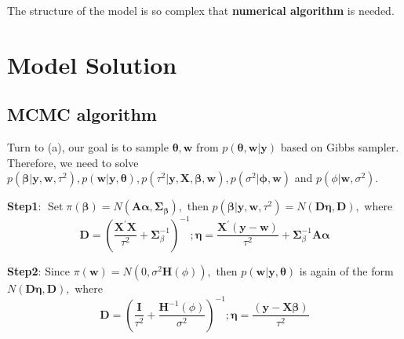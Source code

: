 \documentclass[
]{article}
\begin{document}
The structure of the model is so complex that
\textbf{numerical algorithm} is needed.

\hypertarget{model-solution}{%
\section{Model Solution}\label{model-solution}}

\hypertarget{mcmc-algorithm}{%
\subsection{MCMC algorithm}\label{mcmc-algorithm}}

Turn to (a), our goal is to sample
\(\boldsymbol{\theta}, \boldsymbol{w}\) from
\(p(\boldsymbol{\theta}, \boldsymbol{w} | \boldsymbol{y})\) based on
Gibbs sampler. Therefore, we need to solve
\(p\left(\boldsymbol{\beta} | \boldsymbol{y}, \boldsymbol{w}, \tau^{2}\right), p(\boldsymbol{w} | \boldsymbol{y}, \boldsymbol{\theta}), p\left(\tau^{2} | \boldsymbol{y}, \boldsymbol{X}, \boldsymbol{\beta}, \boldsymbol{w}\right), p\left(\sigma^{2} | \boldsymbol{\phi}, \boldsymbol{w}\right)\)
and \(p\left(\phi | \boldsymbol{w}, \sigma^{2}\right).\)

\textbf{Step1}:
\(\operatorname{Set} \pi(\boldsymbol{\beta})=N\left(\boldsymbol{A} \boldsymbol{\alpha}, \boldsymbol{\Sigma}_{\boldsymbol{\beta}}\right),\)
then
\(p\left(\boldsymbol{\beta} | \boldsymbol{y}, \boldsymbol{w}, \tau^{2}\right)=N(\boldsymbol{D} \boldsymbol{\eta}, \boldsymbol{D}),\)
where \begin{equation}
\boldsymbol{D}=\left(\frac{\bm{X}^{\prime} \bm{X}}{\tau^{2}}+\boldsymbol{\Sigma}_{\beta}^{-1}\right)^{-1} ; \boldsymbol{\eta}=\frac{\boldsymbol{X}^{\prime}(\boldsymbol{y}-\boldsymbol{w})}{\tau^{2}}+\boldsymbol{\Sigma}_{\beta}^{-1} \boldsymbol{A} \boldsymbol{\alpha} \label{Eq:Post_Beta_Dis}
\end{equation}

\textbf{Step2}: Since
\(\pi(\boldsymbol{w})=N\left(0, \sigma^{2} \boldsymbol{H}(\phi)\right),\)
then \(p(\boldsymbol{w} | \boldsymbol{y}, \boldsymbol{\theta})\) is
again of the form
\(N(\boldsymbol{D} \boldsymbol{\eta}, \boldsymbol{D}),\) where
\begin{equation}
\boldsymbol{D}=\left(\frac{\boldsymbol{I}}{\tau^{2}}+\frac{\boldsymbol{H}^{-1}(\phi)}{\sigma^{2}}\right)^{-1} ; \boldsymbol{\eta}=\frac{(\boldsymbol{y}-\boldsymbol{X} \boldsymbol{\beta})}{\tau^{2}} \label{Eq:Post_W_Dis}
\end{equation}
\end{document}
